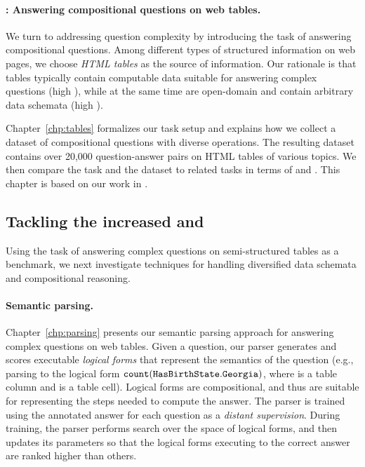 \paragraph{\Depth: Answering compositional questions
on web tables.}
We turn to addressing question complexity
by introducing the task
of answering compositional questions.
Among different types of structured information
on web pages,
we choose \emph{HTML tables}
as the source of information.
Our rationale is that tables
typically contain computable data suitable for
answering complex questions (high \Depth),
while at the same time are open-domain
and contain arbitrary data schemata (high \Breadth).

Chapter~\ref{chp:tables}
formalizes our task setup
and explains how we collect
a dataset of
compositional questions
with diverse operations.
The resulting \wtq dataset
contains over 20,000 question-answer pairs
on HTML tables of various topics.
We then compare the task and the dataset
to related tasks in terms of \Breadth and \Depth.
This chapter is based on our work in
\citet{pasupat2015compositional}.

\subsection{Tackling the increased \Breadth and \Depth}

Using the task of answering complex questions on semi-structured tables
as a benchmark, we next investigate techniques for handling
diversified data schemata and compositional reasoning.

\paragraph{Semantic parsing.}
Chapter~\ref{chp:parsing}
presents our
semantic parsing approach for answering
complex questions on web tables.
Given a question,
our parser generates and scores
executable \emph{logical forms}
that represent the semantics of the question
(e.g., parsing 
to the logical form $\texttt{count}(\texttt{Has}{\texttt{BirthState}}.\texttt{Georgia})$,
where  is a table column
and  is a table cell).
Logical forms are compositional, and thus
are suitable for representing the steps needed
to compute the answer.
%
The parser is trained using the annotated
answer for each question as a \emph{distant supervision}.
During training, the parser performs search
over the space of logical forms,
and then updates its parameters so that
the logical forms executing to the correct answer
are ranked higher than others.

